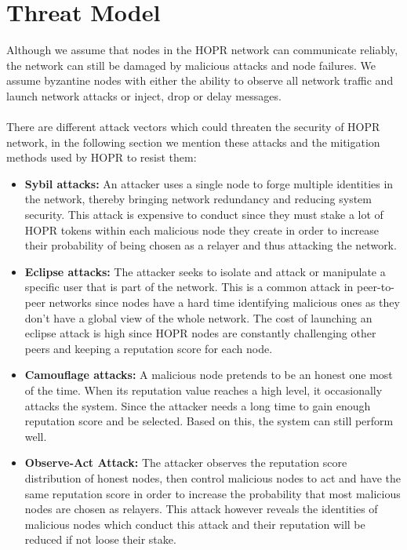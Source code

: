 \section{Threat Model}
Although we assume that nodes in the HOPR network can communicate reliably, the network can still be damaged by malicious attacks and node failures. We assume byzantine nodes with either the ability to observe all network traffic and launch network attacks or inject, drop or delay messages. 
\\~\\There are different attack vectors which could threaten the security of HOPR network, in the following section we mention these attacks and the mitigation methods used by HOPR to resist them:
\begin{itemize}
    \item \textbf{Sybil attacks:} An attacker uses a single node to forge multiple identities in the network, thereby bringing network redundancy and reducing system security. This attack is expensive to conduct since they must stake a lot of HOPR tokens within each malicious node they create in order to increase their probability of being chosen as a relayer and thus attacking the network. 
   \item \textbf{Eclipse attacks:} The attacker seeks to isolate and attack or manipulate a specific user that is part of the network. This is a common attack in peer-to-peer networks since nodes have a hard time identifying malicious ones as they don't have a global view of the whole network. The cost of launching an eclipse attack is high since HOPR nodes are constantly challenging other peers and keeping a reputation score for each node. 
   \item \textbf{Camouflage attacks:} A malicious node pretends to be an honest one most of the time. When its reputation value reaches a high level, it occasionally attacks the system. Since the attacker needs a long time to gain enough reputation score and be selected. Based on this, the system can still perform well.
   \item \textbf{Observe-Act Attack:} The attacker observes the reputation score distribution of honest nodes, then control malicious nodes to act and have the same reputation score in order to increase the probability that most malicious nodes are chosen as relayers.
   This attack however reveals the identities of malicious nodes which conduct this attack and their reputation will be reduced if not loose their stake.
\end{itemize}

